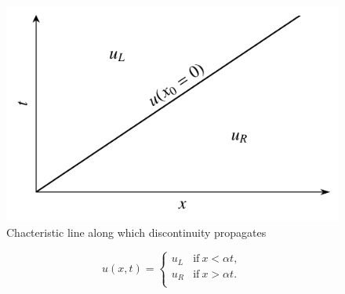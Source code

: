 \begin{figure}[htbp]
	\centering
	\includegraphics[width=0.5\linewidth]{Pictures/riem_lsc_characteristics}
	\caption{Chacteristic line along which discontinuity propagates}
	\label{fig:riem_charact_scalar}
\end{figure}
\begin{eqBox}
\begin{equation}
	u(x,t) = 
	\begin{cases}
		u_L & \text{if}~x<\alpha t,\\
		u_R & \text{if}~x>\alpha t.\\
	\end{cases}
\end{equation}
\end{eqBox}
